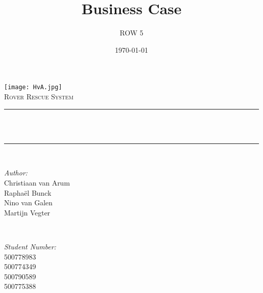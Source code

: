 \title{Business Case}
\author{ROW 5}
\date{\today}

\makeatletter
\let\thetitle\@title
\let\theauthor\@author
\let\thedate\@date
\makeatother

\pagestyle{fancy}
\fancyhf{}
\rhead{\theauthor}
\lhead{\thetitle}
\cfoot{\thepage}


	\begin{titlepage}
		\centering
		\vspace*{0.5 cm}
		\texttt{[image: HvA.jpg]}\\[1.0 cm]
		\textsc{\Large Rover Rescue System}\\[0.5 cm]
		\rule{\linewidth}{0.2 mm} \\[0.4 cm]
		{ \huge \bfseries \thetitle}\\
		\rule{\linewidth}{0.2 mm} \\[1.5 cm]
		
		\begin{minipage}{0.4\textwidth}
			\begin{flushleft} \large
				\emph{Author:}\\
				Christiaan van Arum\\
				Rapha\"el Bunck\\
				Nino van Galen\\
				Martijn Vegter
			\end{flushleft}
		\end{minipage}~
		\begin{minipage}{0.4\textwidth}
			\begin{flushright} \large
				\emph{Student Number:} \\
				500778983\\ %
				500774349\\ %
				500790589\\ %
				500775388	%
			\end{flushright}
		\end{minipage}\\[2 cm]
		
		{\large \thedate}\\[2 cm]
		
		\vfill
		
	\end{titlepage}
